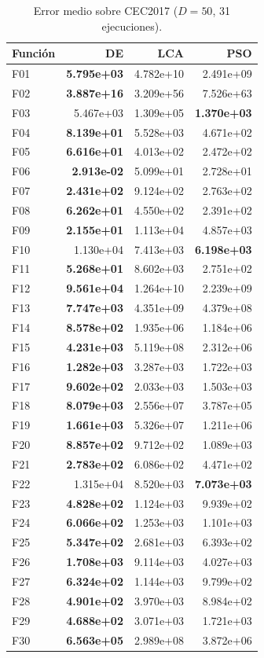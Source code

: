 \begin{table}[h!]
\centering
\caption{Error medio sobre CEC2017 ($D=50$, 31 ejecuciones).}
\label{tab:res_d50}
\footnotesize
\renewcommand{\arraystretch}{1.1}
\begin{tabular}{@{}lrrr@{}}
\toprule
\textbf{Función} & \textbf{DE} & \textbf{LCA} & \textbf{PSO} \\
\midrule
F01 & \textbf{5.795e+03} & 4.782e+10 & 2.491e+09 \\
F02 & \textbf{3.887e+16} & 3.209e+56 & 7.526e+63 \\
F03 & 5.467e+03 & 1.309e+05 & \textbf{1.370e+03} \\
F04 & \textbf{8.139e+01} & 5.528e+03 & 4.671e+02 \\
F05 & \textbf{6.616e+01} & 4.013e+02 & 2.472e+02 \\
F06 & \textbf{2.913e-02} & 5.099e+01 & 2.728e+01 \\
F07 & \textbf{2.431e+02} & 9.124e+02 & 2.763e+02 \\
F08 & \textbf{6.262e+01} & 4.550e+02 & 2.391e+02 \\
F09 & \textbf{2.155e+01} & 1.113e+04 & 4.857e+03 \\
F10 & 1.130e+04 & 7.413e+03 & \textbf{6.198e+03} \\
F11 & \textbf{5.268e+01} & 8.602e+03 & 2.751e+02 \\
F12 & \textbf{9.561e+04} & 1.264e+10 & 2.239e+09 \\
F13 & \textbf{7.747e+03} & 4.351e+09 & 4.379e+08 \\
F14 & \textbf{8.578e+02} & 1.935e+06 & 1.184e+06 \\
F15 & \textbf{4.231e+03} & 5.119e+08 & 2.312e+06 \\
F16 & \textbf{1.282e+03} & 3.287e+03 & 1.722e+03 \\
F17 & \textbf{9.602e+02} & 2.033e+03 & 1.503e+03 \\
F18 & \textbf{8.079e+03} & 2.556e+07 & 3.787e+05 \\
F19 & \textbf{1.661e+03} & 5.326e+07 & 1.211e+06 \\
F20 & \textbf{8.857e+02} & 9.712e+02 & 1.089e+03 \\
F21 & \textbf{2.783e+02} & 6.086e+02 & 4.471e+02 \\
F22 & 1.315e+04 & 8.520e+03 & \textbf{7.073e+03} \\
F23 & \textbf{4.828e+02} & 1.124e+03 & 9.939e+02 \\
F24 & \textbf{6.066e+02} & 1.253e+03 & 1.101e+03 \\
F25 & \textbf{5.347e+02} & 2.681e+03 & 6.393e+02 \\
F26 & \textbf{1.708e+03} & 9.114e+03 & 4.027e+03 \\
F27 & \textbf{6.324e+02} & 1.144e+03 & 9.799e+02 \\
F28 & \textbf{4.901e+02} & 3.970e+03 & 8.984e+02 \\
F29 & \textbf{4.688e+02} & 3.071e+03 & 1.721e+03 \\
F30 & \textbf{6.563e+05} & 2.989e+08 & 3.872e+06 \\
\bottomrule
\end{tabular}
\end{table}

